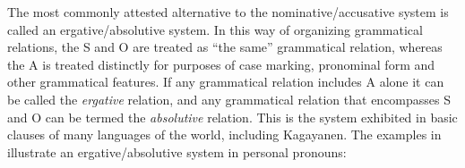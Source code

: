 The most commonly attested alternative to the nominative/accusative system is called an ergative/absolutive system. In this way of organizing grammatical relations, the S and O are treated as “the same” grammatical relation, whereas the A is treated distinctly for purposes of case marking, pronominal form and other grammatical features. If any grammatical relation includes A alone it can be called the \textit{ergative} relation, and any grammatical relation that encompasses S and O can be termed the \textit{absolutive} relation. This is the system exhibited in basic clauses of many languages of the world, including Kagayanen. The examples in  illustrate an ergative/absolutive system in personal pronouns:

